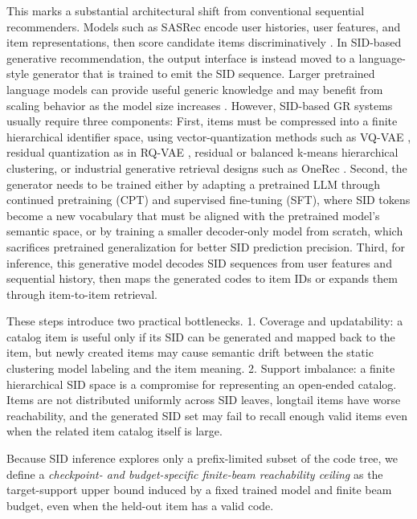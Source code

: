\documentclass[letterpaper]{article}
\newcommand{\hx}[1]{}
\begin{document}
This marks a substantial architectural shift from conventional sequential recommenders. Models such as SASRec encode user histories, user features, and item representations, then score candidate items discriminatively \citep{kang2018sasrec}. In SID-based generative recommendation, the output interface is instead moved to a language-style generator that is trained to emit the SID sequence. Larger pretrained language models can provide useful generic knowledge and may benefit from scaling behavior as the model size increases \citep{kaplan2020scaling}. However, SID-based GR systems usually require three components: First, items must be compressed into a finite hierarchical identifier space, using vector-quantization methods such as VQ-VAE \citep{vandenoord2017vqvae}, residual quantization as in RQ-VAE \citep{lee2022rqvae}, residual or balanced k-means hierarchical clustering, or industrial generative retrieval designs such as OneRec \citep{deng2025onerec}. Second, the generator needs to be trained either by adapting a pretrained LLM through continued pretraining (CPT) and supervised fine-tuning (SFT), where SID tokens become a new vocabulary that must be aligned with the pretrained model's semantic space, or by training a smaller decoder-only model from scratch, which sacrifices pretrained generalization for better SID prediction precision. Third, for inference, this generative model decodes SID sequences from user features and sequential history, then maps the generated codes to item IDs or expands them through item-to-item retrieval. 

These steps introduce two practical bottlenecks. 1. Coverage and updatability: a catalog item is useful only if its SID can be generated and mapped back to the item, but newly created items may cause semantic drift between the static clustering model labeling and the item meaning. 2. Support imbalance: a finite hierarchical SID space is a compromise for representing an open-ended catalog. Items are not distributed uniformly across SID leaves, longtail items have worse reachability, and the generated SID set may fail to recall enough valid items even when the related item catalog itself is large.

Because SID inference explores only a prefix-limited subset of the code tree,
we define a \emph{checkpoint- and budget-specific finite-beam reachability
ceiling} as the target-support upper bound induced by a fixed trained model and finite beam budget, even when
the held-out item has a valid code.
\end{document}
